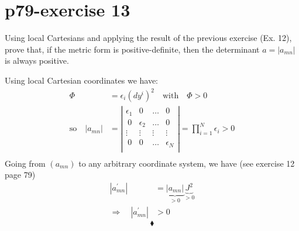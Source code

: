 \section{p79-exercise 13}
\begin{tcolorbox}
Using local Cartesians and applying the result of the previous exercise (Ex. 12), prove that, if the metric form is positive-definite, then the determinant $a= \left | a_{mn} \right |$ is always positive.
\end{tcolorbox}
Using local Cartesian coordinates we have:
\begin{align}
\Phi &= \epsilon_i (dy^i)^2 \quad \text{with} \quad \Phi > 0\\
\text{so}\quad \left | a_{mn} \right |  &= \left | \begin{array}{cccc}  
\epsilon_1&0&\dots & 0\\
\ 0&\epsilon_2&\dots & 0\\
\vdots&\vdots&\vdots & \vdots\\
\ 0&0&\dots & \epsilon_N\\
\end{array} \right | = \prod_{i=1}^{N}\epsilon_i >0\\
\end{align}
Going from $\left( a_{mn} \right)$ to any arbitrary coordinate system, we have (see exercise 12 page 79) 
\begin{align}
\left | a^{'}_{mn} \right | &= \underbrace{\left | a_{mn} \right |}_{>0}\underbrace{J^2}_{>0}\\
\Rightarrow \quad\left | a^{'}_{mn} \right | &>0
\end{align}
$$\blacklozenge$$
\newpage

